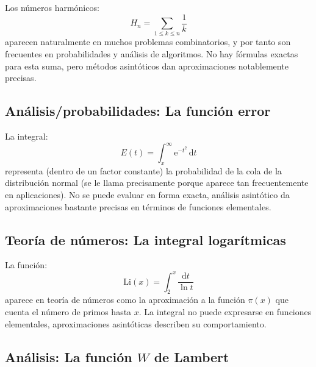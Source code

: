   Los números harmónicos:
  \begin{equation*}
    H_n
      = \sum_{1 \le k \le n} \frac{1}{k}
  \end{equation*}
  aparecen naturalmente en muchos problemas combinatorios,
  y por tanto son frecuentes en probabilidades y análisis de algoritmos.
  No hay fórmulas exactas para esta suma,
  pero métodos asintóticos dan aproximaciones notablemente precisas.

\subsection{Análisis/probabilidades:
                La función error}
\label{sec:analysis:error-function}

  La integral:
  \begin{equation*}
    E(t)
      = \int_x^\infty \mathrm{e}^{-t^2} \, \mathrm{d} t
  \end{equation*}
  representa
  (dentro de un factor constante)
  la probabilidad de la cola de la distribución normal
  (se le llama  precisamente
   porque aparece tan frecuentemente en aplicaciones).
  No se puede evaluar en forma exacta,
  análisis asintótico da aproximaciones bastante precisas
  en términos de funciones elementales.

\subsection{Teoría de números:
                La integral logarítmicas}
\label{sec:number-theory:li}

  La función:
  \begin{equation*}
    \mathrm{Li}(x)
      = \int_2^x \frac{\mathrm{d} t}{\ln t}
  \end{equation*}
  aparece en teoría de números como la  aproximación
  a la función \(\pi(x)\) que cuenta el número de primos hasta \(x\).
  La integral no puede expresarse en funciones elementales,
  aproximaciones asintóticas describen su comportamiento.

\subsection{Análisis:
                La función \(W\) de Lambert}
\label{sec:analisis:W}

